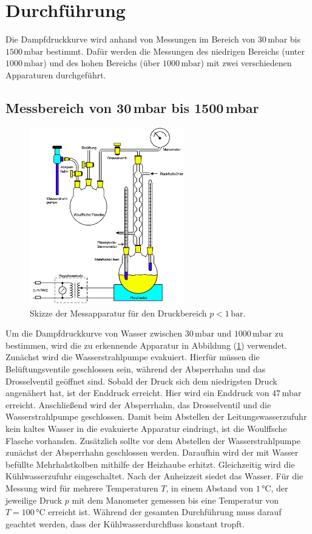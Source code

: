 \section{Durchführung}
\label{sec:Durchführung}
Die Dampfdruckkurve wird anhand von Messungen im Bereich von $30\,\unit{\milli\bar}$ bis $1500\, \unit{\milli\bar}$ bestimmt.
Dafür werden die Messungen des niedrigen Bereichs (unter $1000\, \unit{\milli\bar}$) und des hohen Bereichs (über $1000\, \unit{\milli\bar}$)
mit zwei verschiedenen Apparaturen durchgeführt.
\subsection{Messbereich von 30\,mbar bis 1500\,mbar}
\label{sec:ErsteDurchführung}
\begin{figure}[H]
    \centering
    \includegraphics[width=0.60\textwidth]{Erste_Apparatur.png}
    \caption{Skizze der Messapparatur für den Druckbereich $p<1\,\unit{\bar}$. \cite{anleitungV203}}
    \label{fig:ErsteApparatur}
\end{figure}
Um die Dampfdruckkurve von Wasser zwischen $30\,\unit{\milli\bar}$ und $1000\,\unit{\milli\bar}$ zu bestimmen, wird die zu erkennende Apparatur in Abbildung
(\ref{fig:ErsteApparatur}) verwendet. Zunächst wird die Wasserstrahlpumpe evakuiert. Hierfür müssen die Belüftungsventile geschlossen sein, während der Absperrhahn
und das Drosselventil geöffnet sind. Sobald der Druck sich dem niedrigsten Druck angenähert hat, ist der Enddruck erreicht. Hier wird ein Enddruck von $47\,\unit{\milli\bar}$ erreicht. 
Anschließend wird der Absperrhahn, das Drosselventil und die Wasserstrahlpumpe geschlossen. Damit beim Abstellen der Leitungswasserzufuhr kein kaltes Wasser in die
evakuierte Apparatur eindringt, ist die Woulffsche Flasche vorhanden. Zusätzlich sollte vor dem Abstellen der Wasserstrahlpumpe zunächst der Absperrhahn geschlossen werden.
Daraufhin wird der mit Wasser befüllte Mehrhalstkolben mithilfe der Heizhaube erhitzt. Gleichzeitig wird die Kühlwasserzufuhr eingeschaltet. Nach der Anheizzeit siedet das Wasser.
Für die Messung wird für mehrere Temperaturen $T$, in einem Abstand von $1\,\unit{\celsius}$, der jeweilige Druck $p$ mit dem Manometer gemessen bis eine Temperatur von $T= 100\,\unit{\celsius}$ erreicht ist.
Während der gesamten Durchführung muss darauf geachtet werden, dass der Kühlwasserdurchfluss konstant tropft.
